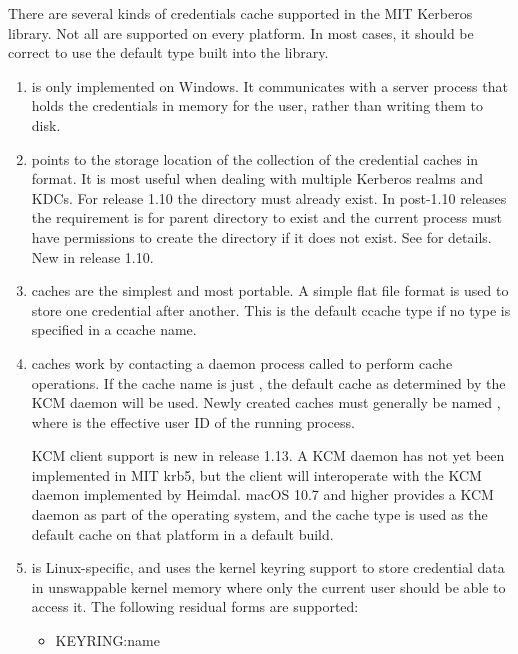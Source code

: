 \documentclass[letterpaper,10pt,english]{sphinxmanual}
\begin{document}
There are several kinds of credentials cache supported in the MIT
Kerberos library.  Not all are supported on every platform.  In most
cases, it should be correct to use the default type built into the
library.
\begin{enumerate}
\item {} 
 is only implemented on Windows.  It communicates with a
server process that holds the credentials in memory for the user,
rather than writing them to disk.

\item {} 
 points to the storage location of the collection of the
credential caches in  format. It is most useful when dealing
with multiple Kerberos realms and KDCs.  For release 1.10 the
directory must already exist.  In post-1.10 releases the
requirement is for parent directory to exist and the current
process must have permissions to create the directory if it does
not exist. See {\hyperref[\detokenize{basic/ccache_def:col-ccache}]{}} for details.  New in release 1.10.

\item {} 
 caches are the simplest and most portable. A simple flat
file format is used to store one credential after another.  This is
the default ccache type if no type is specified in a ccache name.

\item {} 
 caches work by contacting a daemon process called 
to perform cache operations.  If the cache name is just ,
the default cache as determined by the KCM daemon will be used.
Newly created caches must generally be named ,
where  is the effective user ID of the running process.

KCM client support is new in release 1.13.  A KCM daemon has not
yet been implemented in MIT krb5, but the client will interoperate
with the KCM daemon implemented by Heimdal.  macOS 10.7 and higher
provides a KCM daemon as part of the operating system, and the
 cache type is used as the default cache on that platform in
a default build.

\item {} 
 is Linux-specific, and uses the kernel keyring support
to store credential data in unswappable kernel memory where only
the current user should be able to access it.  The following
residual forms are supported:
\begin{itemize}
\item {} 
KEYRING:name


\end{itemize}
\end{enumerate}
\end{document}
